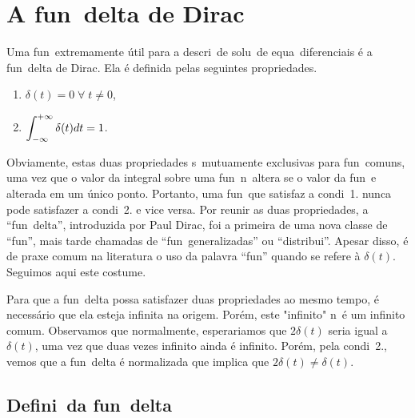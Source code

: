 
\section{A fun\cao\ delta de Dirac}

Uma fun\cao\ extremamente \'util para a descri\cao\ de solu\coes\ de
equa\coes\ diferenciais \'e a fun\cao\ delta de Dirac. Ela \'e definida
pelas seguintes propriedades.
\begin{enumerate}
\item \hspace*{1cm} $\displaystyle \delta(t) = 0 \; \forall \; t \neq 0 $,
\item \hspace*{1cm} $\displaystyle \int_{-\infty}^{+\infty} \delta(t) dt = 1 $.
\end{enumerate}
Obviamente, estas duas propriedades s\ao\ mutuamente exclusivas para
fun\coes\ comuns, uma vez que o valor da integral sobre uma fun\cao\ n\ao\ altera se o
valor da fun\cao\ e alterada em um \'unico ponto. Portanto, uma fun\cao\
que satisfaz a condi\cao\ 1. nunca pode satisfazer a condi\cao\ 2. e
vice versa. Por reunir as duas propriedades, a ``fun\cao\ delta'',
introduzida por Paul Dirac, foi a primeira de uma nova classe de
``fun\coes'', mais tarde chamadas de ``fun\coes\ generalizadas'' ou
``distribui\coes''. Apesar disso, \'e de praxe comum na literatura
o uso da palavra ``fun\cao'' quando se refere \`a $\delta(t)$. Seguimos
aqui este costume.

Para que a fun\cao\ delta possa satisfazer duas propriedades ao mesmo
tempo, \'e necess\'ario que ela esteja infinita na origem. Por\'em, este
"infinito" n\ao\ \'e um infinito comum. Observamos que normalmente,
esperariamos que $2\delta(t)$ seria igual a $\delta(t)$, uma vez que
duas vezes infinito ainda \'e infinito. Por\'em, pela condi\cao\ 2.,
vemos que a fun\cao\ delta \'e normalizada que implica que
$2\delta(t)\neq\delta(t)$.

\subsection{Defini\cao\ da fun\cao\ delta}


